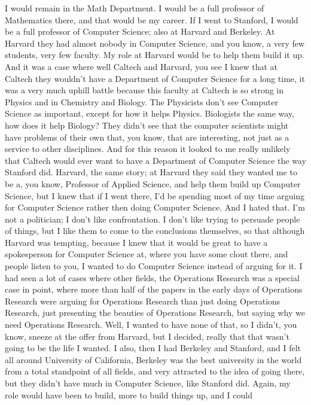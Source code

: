 \documentclass[]{article}
\begin{document}
I would remain in the Math Department. I would be a full professor of
Mathematics there, and that would be my career. If I went to Stanford, I
would be a full professor of Computer Science; also at Harvard and
Berkeley. At Harvard they had almost nobody in Computer Science, and you
know, a very few students, very few faculty. My role at Harvard would be
to help them build it up. And it was a case where well Caltech and
Harvard, you see I knew that at Caltech they wouldn't have a Department
of Computer Science for a long time, it was a very much uphill battle
because this faculty at Caltech is so strong in Physics and in Chemistry
and Biology. The Physicists don't see Computer Science as important,
except for how it helps Physics. Biologists the same way, how does it
help Biology? They didn't see that the computer scientists might have
problems of their own that, you know, that are interesting, not just as
a service to other disciplines. And for this reason it looked to me
really unlikely that Caltech would ever want to have a Department of
Computer Science the way Stanford did. Harvard, the same story; at
Harvard they said they wanted me to be a, you know, Professor of Applied
Science, and help them build up Computer Science, but I knew that if I
went there, I'd be spending most of my time arguing for Computer Science
rather then doing Computer Science. And I hated that. I'm not a
politician; I don't like confrontation. I don't like trying to persuade
people of things, but I like them to come to the conclusions themselves,
so that although Harvard was tempting, because I knew that it would be
great to have a spokesperson for Computer Science at, where you have
some clout there, and people listen to you, I wanted to do Computer
Science instead of arguing for it. I had seen a lot of cases where other
fields, the Operations Research was a special case in point, where more
than half of the papers in the early days of Operations Research were
arguing for Operations Research than just doing Operations Research,
just presenting the beauties of Operations Research, but saying why we
need Operations Research. Well, I wanted to have none of that, so I
didn't, you know, sneeze at the offer from Harvard, but I decided,
really that that wasn't going to be the life I wanted. I also, then I
had Berkeley and Stanford, and I felt all around University of
California, Berkeley was the best university in the world from a total
standpoint of all fields, and very attracted to the idea of going there,
but they didn't have much in Computer Science, like Stanford did. Again,
my role would have been to build, more to build things up, and I could
\end{document}
